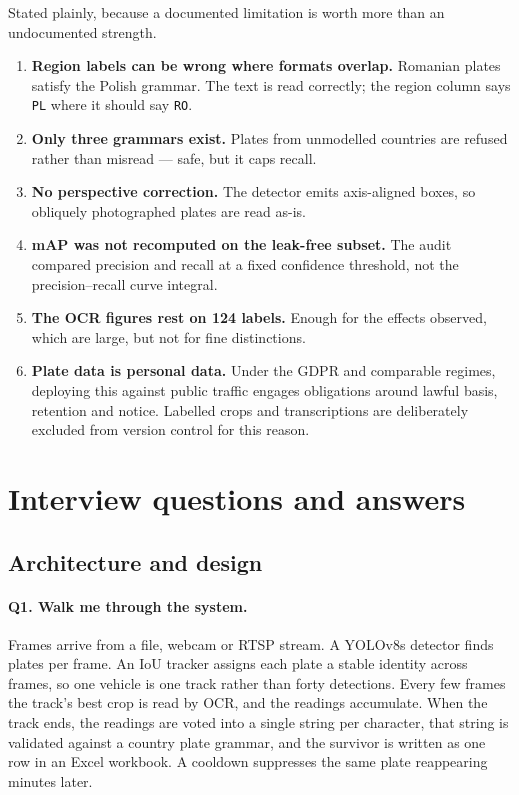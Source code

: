 \documentclass[11pt,a4paper]{article}
\begin{document}
Stated plainly, because a documented limitation is worth more than an
undocumented strength.

\begin{enumerate}[leftmargin=*]
  \item \textbf{Region labels can be wrong where formats overlap.} Romanian
    plates satisfy the Polish grammar. The text is read correctly; the region
    column says \texttt{PL} where it should say \texttt{RO}.
  \item \textbf{Only three grammars exist.} Plates from unmodelled countries are
    refused rather than misread --- safe, but it caps recall.
  \item \textbf{No perspective correction.} The detector emits axis-aligned
    boxes, so obliquely photographed plates are read as-is.
  \item \textbf{mAP was not recomputed on the leak-free subset.} The audit
    compared precision and recall at a fixed confidence threshold, not the
    precision--recall curve integral.
  \item \textbf{The OCR figures rest on 124 labels.} Enough for the effects
    observed, which are large, but not for fine distinctions.
  \item \textbf{Plate data is personal data.} Under the GDPR and comparable
    regimes, deploying this against public traffic engages obligations around
    lawful basis, retention and notice. Labelled crops and transcriptions are
    deliberately excluded from version control for this reason.
\end{enumerate}

\newpage
\section{Interview questions and answers}

\subsection*{Architecture and design}

\paragraph{Q1. Walk me through the system.}
Frames arrive from a file, webcam or RTSP stream. A YOLOv8s detector finds plates
per frame. An IoU tracker assigns each plate a stable identity across frames, so
one vehicle is one track rather than forty detections. Every few frames the
track's best crop is read by OCR, and the readings accumulate. When the track
ends, the readings are voted into a single string per character, that string is
validated against a country plate grammar, and the survivor is written as one row
in an Excel workbook. A cooldown suppresses the same plate reappearing minutes
later.
\end{document}
